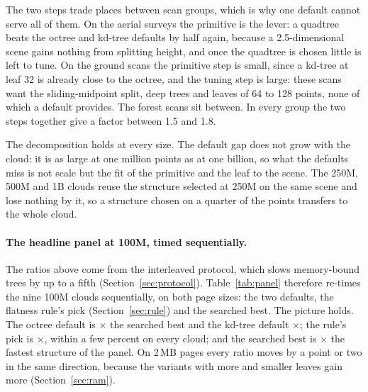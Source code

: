 The two steps trade places between scan groups, which is why one default cannot serve all of them. On the aerial surveys the primitive is the lever: a quadtree beats the octree and kd-tree defaults by half again, because a 2.5-dimensional scene gains nothing from splitting height, and once the quadtree is chosen little is left to tune. On the ground scans the primitive step is small, since a kd-tree at leaf 32 is already close to the octree, and the tuning step is large: these scans want the sliding-midpoint split, deep trees and leaves of 64 to 128 points, none of which a default provides. The forest scans sit between. In every group the two steps together give a factor between 1.5 and 1.8.

The decomposition holds at every size. The default gap does not grow with the cloud: it is as large at one million points as at one billion, so what the defaults miss is not scale but the fit of the primitive and the leaf to the scene. The 250M, 500M and 1B clouds reuse the structure selected at 250M on the same scene and lose nothing by it, so a structure chosen on a quarter of the points transfers to the whole cloud.

\paragraph{The headline panel at 100M, timed sequentially.} The ratios above come from the interleaved protocol, which slows memory-bound trees by up to a fifth (Section~\ref{sec:protocol}). Table~\ref{tab:panel} therefore re-times the nine 100M clouds sequentially, on both page sizes: the two defaults, the flatness rule's pick (Section~\ref{sec:rule}) and the searched best. The picture holds. The octree default is \panelOctreeDefaultBase$\times$ the searched best and the kd-tree default \panelKdDefaultBase$\times$; the rule's pick is \panelRuleBase$\times$, within a few percent on every cloud; and the searched best is \panelPickOracleBase$\times$ the fastest structure of the panel. On 2\,MB pages every ratio moves by a point or two in the same direction, because the variants with more and smaller leaves gain more (Section~\ref{sec:ram}).

\begin{table}[t]
\centering\footnotesize
\caption{The headline panel at 100 million points, sequential protocol, geometric mean (range, clouds) of per-cloud ratios, on 4\,KiB and on 2\,MB pages. \emph{Searched best}: the structure selected by the search on the other half of the trace; \emph{flatness rule}: the pick of the rule of Section~\ref{sec:rule}. The last row is each structure on 2\,MB pages over itself on 4\,KiB pages.}
\label{tab:panel}

\end{table}
